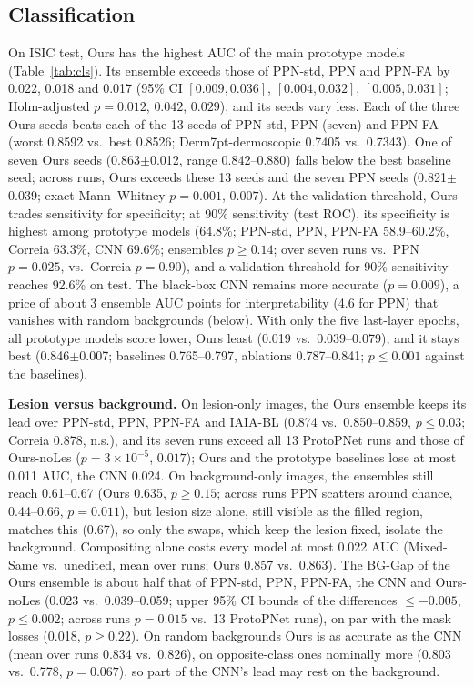 \documentclass[conference]{IEEEtran}
\begin{document}
\subsection{Classification}
\label{sec:cls}
On ISIC test, Ours has the highest AUC of the main prototype models (Table~\ref{tab:cls}). Its ensemble exceeds those of PPN-std, PPN and PPN-FA by 0.022, 0.018 and 0.017 (95\% CI $[0.009,0.036]$, $[0.004,0.032]$, $[0.005,0.031]$; Holm-adjusted $p=0.012$, $0.042$, $0.029$), and its seeds vary less. Each of the three Ours seeds beats each of the 13 seeds of PPN-std, PPN (seven) and PPN-FA (worst 0.8592 vs.\ best 0.8526; Derm7pt-dermoscopic 0.7405 vs.\ 0.7343). One of seven Ours seeds (0.863$\pm$0.012, range 0.842--0.880) falls below the best baseline seed; across runs, Ours exceeds these 13 seeds and the seven PPN seeds (0.821$\pm$0.039; exact Mann--Whitney $p=0.001$, $0.007$). At the validation threshold, Ours trades sensitivity for specificity; at 90\% sensitivity (test ROC), its specificity is highest among prototype models (64.8\%; PPN-std, PPN, PPN-FA 58.9--60.2\%, Correia 63.3\%, CNN 69.6\%; ensembles $p\geq0.14$; over seven runs vs.\ PPN $p=0.025$, vs.\ Correia $p=0.90$), and a validation threshold for 90\% sensitivity reaches 92.6\% on test. The black-box CNN remains more accurate ($p=0.009$), a price of about 3 ensemble AUC points for interpretability (4.6 for PPN) that vanishes with random backgrounds (below). With only the five last-layer epochs, all prototype models score lower, Ours least (0.019 vs.\ 0.039--0.079), and it stays best (0.846$\pm$0.007; baselines 0.765--0.797, ablations 0.787--0.841; $p\leq0.001$ against the baselines).


\textbf{Lesion versus background.} On lesion-only images, the Ours ensemble keeps its lead over PPN-std, PPN, PPN-FA and IAIA-BL (0.874 vs.\ 0.850--0.859, $p\leq0.03$; Correia 0.878, n.s.), and its seven runs exceed all 13 ProtoPNet runs and those of Ours-noLes ($p=3\times10^{-5}$, $0.017$); Ours and the prototype baselines lose at most 0.011 AUC, the CNN 0.024. On background-only images, the ensembles still reach 0.61--0.67 (Ours 0.635, $p\geq0.15$; across runs PPN scatters around chance, 0.44--0.66, $p=0.011$), but lesion size alone, still visible as the filled region, matches this (0.67), so only the swaps, which keep the lesion fixed, isolate the background. Compositing alone costs every model at most 0.022 AUC (Mixed-Same vs.\ unedited, mean over runs; Ours 0.857 vs.\ 0.863). The BG-Gap of the Ours ensemble is about half that of PPN-std, PPN, PPN-FA, the CNN and Ours-noLes (0.023 vs.\ 0.039--0.059; upper 95\% CI bounds of the differences $\leq-0.005$, $p\leq0.002$; across runs $p=0.015$ vs.\ 13 ProtoPNet runs), on par with the mask losses (0.018, $p\geq0.22$). On random backgrounds Ours is as accurate as the CNN (mean over runs 0.834 vs.\ 0.826), on opposite-class ones nominally more (0.803 vs.\ 0.778, $p=0.067$), so part of the CNN's lead may rest on the background.
\end{document}
